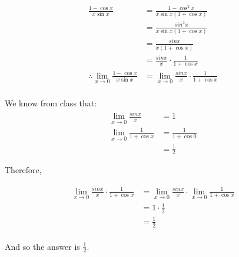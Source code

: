 \documentclass[12pt]{article} %
\begin{document}
\begin{homeworkProblem}


    \begin{align*}
        \frac{1 - \cos{x}}{x\sin{x}}
         & = \frac{1 - \cos^2{x}}{x\sin{x}(1 + \cos{x})}                 \\
         & = \frac{sin^2{x}}{x\sin{x}(1 + \cos{x})}                      \\
         & = \frac{sin{x}}{x(1 + \cos{x})}                               \\
         & = \frac{sin{x}}{x} \cdot \frac{1}{1 + \cos{x}}                \\
        \therefore
        \lim_{x \to 0} \frac{1 - \cos{x}}{x\sin{x}}
         & = \lim_{x \to 0} \frac{sin{x}}{x} \cdot \frac{1}{1 + \cos{x}} \\
    \end{align*}

    We know from class that:
    \begin{align*}
        \lim_{x \to 0} \frac{sin{x}}{x}      & = 1                     \\
        \lim_{x \to 0} \frac{1}{1 + \cos{x}} & = \frac{1}{1 + \cos{0}} \\
                                             & = \frac{1}{2}
    \end{align*}

    Therefore,

    \begin{align*}
        \lim_{x \to 0} \frac{sin{x}}{x} \cdot \frac{1}{1 + \cos{x}}
         & = \lim_{x \to 0} \frac{sin{x}}{x} \cdot \lim_{x \to 0} \frac{1}{1 + \cos{x}} \\
         & = 1 \cdot \frac{1}{2}                                                        \\
         & = \frac{1}{2}                                                                \\
    \end{align*}

    And so the answer is $\frac{1}{2}$.
\end{homeworkProblem}

\pagebreak
\end{document}
